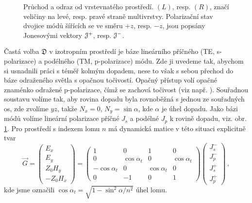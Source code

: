 \begin{figure}
    \centering
    
    \caption{Průchod a odraz od vrstevnatého prostředí. $(L)$, resp. $(R)$, značí veličiny na levé, resp. pravé straně multivrstvy. Polarizační stav dvojice módů šířících se ve směru $+z$, resp. $-z$, jsou popsány Jonesovými vektory $\mathcal{J}^+$, resp. $\mathcal{J}^-$.}
    \label{fig:odraz-pruchod}
\end{figure}

Častá volba $\mathfrak{D}$ v izotropním prostředí je báze lineárního příčného (TE, s-polarizace) a podélného (TM, p-polarizace) módu.
Zde ji uvedeme tak, abychom si usnadnili práci s téměř kolmým dopadem, nese to však s sebou přechod do báze odraženého světla s opačnou točivostí.
Opačný přístup volí opačné znaménko odražené p-polarizace, čímž se zachová točivost (viz např. \cite{silberQuadraticMagnetoopticKerr2019a}).
Souřadnou soustavu volíme tak, aby rovina dopadu byla rovnoběžná s jednou ze souřadných os, zde zvolíme $yz$, takže $N_x=0$, $N_y=\sin \alpha$, kde $\alpha$ je úhel dopadu.
Jako bázi módů volíme lineární polarizace příčné $J_s$ a podélné $J_p$ k rovině dopadu, viz. obr. \ref{fig:odraz-pruchod}.
Pro prostředí s indexem lomu $n$ má dynamická matice v této situaci explicitně tvar
\begin{equation}
    \vec{G} = \begin{pmatrix} E_x \\ E_y \\ Z_0 H_y \\ -Z_0 H_x \end{pmatrix}
    =\begin{pmatrix}
        1 & 0 & 1 & 0 \\
        0 & \cos\alpha_t & 0 & \cos\alpha_t \\
        -\cos\alpha_t & 0 & \cos\alpha_t & 0 \\
        0 & -1 & 0 & 1
    \end{pmatrix}
    \begin{pmatrix}
        J^-_{s} \\ J^-_{p} \\ J^+_s \\ J^+_{p} 
    \end{pmatrix} \,,
\end{equation}
kde jsme označili $\cos \alpha_t = \sqrt{1-\sin^2 \alpha /n^2}$ úhel lomu.

